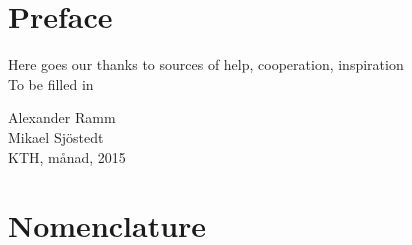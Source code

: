 \documentclass[a4paper,11pt]{kth-mag}
\begin{document}
\chapter*{Preface}
Here goes our thanks to sources of  help, cooperation, inspiration \\ To be filled in \\
\begin{flushright}Alexander Ramm \\Mikael Sjöstedt \\ KTH, månad, 2015 \end{flushright}




\cleardoublepage
{}
\printindex
\tableofcontents*

\cleardoublepage
\chapter*{Nomenclature}
\end{document}
